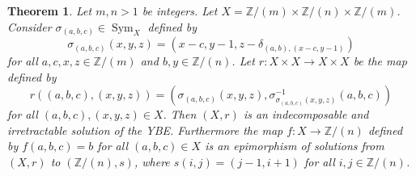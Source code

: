\documentclass[10pt]{article}
\newtheorem{theorem}{Theorem}[section]
\newcommand{\Z}{\mathbb{Z}}
\newcommand{\Sym}{\operatorname{Sym}}
\begin{document}
\begin{theorem}
    Let $m,n>1$ be integers.
    Let $X=\Z /(m)\times \Z/(n)\times \Z/(m)$. Consider $\sigma_{(a,b,c)}\in \Sym_X$ defined by
    $$\sigma_{(a,b,c)}(x,y,z)=(x-c,y-1,z-\delta_{(a,b),(x-c,y-1)})$$
    for all $a,c,x,z\in\Z/(m)$ and $b,y\in\Z/(n)$. Let $r\colon X\times X\longrightarrow X\times X$ be the map defined by
    $$r((a,b,c),(x,y,z))=(\sigma_{(a,b,c)}(x,y,z),\sigma^{-1}_{\sigma_{(a,b,c)}(x,y,z)}(a,b,c))$$
    for all $(a,b,c),(x,y,z)\in X$. Then $(X,r)$ is an indecomposable and irretractable solution of the YBE.
    Furthermore the map $f\colon X\longrightarrow \Z/(n)$ defined by $f(a,b,c)=b$ for all $(a,b,c)\in X$
    is an epimorphism of solutions from $(X,r)$ to $(\Z/(n),s)$, where $s(i,j)=(j-1,i+1)$ for all $i,j\in\Z/(n)$.
\end{theorem}
\end{document}
